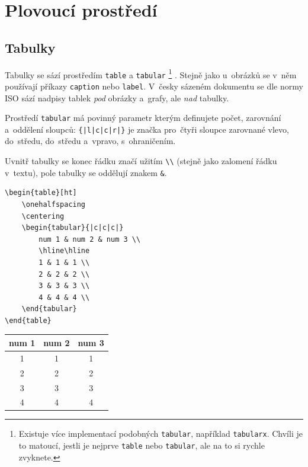 \clearpage
\section{Plovoucí prostředí}

\subsection{Tabulky}

Tabulky se sází prostředím \texttt{table} a \texttt{tabular}%
\footnote{
    Existuje více implementací podobných \texttt{tabular}, například \texttt{tabularx}.
    Chvíli je to matoucí, jestli je nejprve \texttt{table} nebo \texttt{tabular}, ale na to si rychle zvyknete.
}%
.
Stejně jako u~obrázků se v~něm používají příkazy \texttt{caption} nebo \texttt{label}.
V~česky sázeném dokumentu se dle normy ISO sází nadpisy tablek \emph{pod} obrázky a~grafy, ale \emph{nad} tabulky.

Prostředí \texttt{tabular} má povinný parametr kterým definujete počet, zarovnání a~oddělení sloupců: \verb_{|l|c|c|r|}_ je značka pro~čtyři sloupce zarovnané vlevo, do~středu, do~středu a~vpravo, s~ohraničením.

Uvnitř tabulky se konec řádku značí užitím \verb|\\| (stejně jako zalomení řádku v~textu), pole tabulky se oddělují znakem \verb|&|.

\begin{mdframed}
\begin{verbatim}
\begin{table}[ht]
    \onehalfspacing
    \centering
    \begin{tabular}{|c|c|c|}
        num 1 & num 2 & num 3 \\
        \hline\hline
        1 & 1 & 1 \\
        2 & 2 & 2 \\
        3 & 3 & 3 \\
        4 & 4 & 4 \\ 
    \end{tabular}
\end{table}
\end{verbatim}
    \label{tbl:dvanact_hodnot}
    \begin{tabular}{|c|c|c|}
        num 1 & num 2 & num 3 \\
        \hline\hline
        1 & 1 & 1 \\
        2 & 2 & 2 \\
        3 & 3 & 3 \\
        4 & 4 & 4 \\ 
    \end{tabular}
\end{mdframed}
\FloatBarrier


